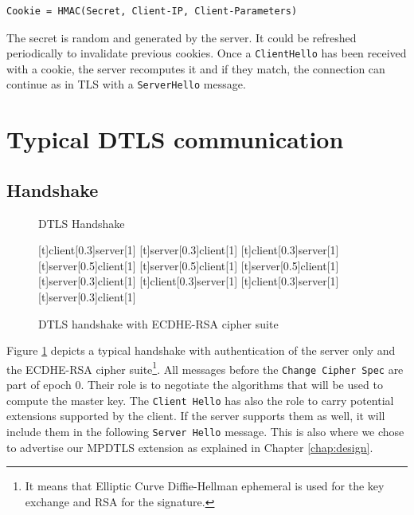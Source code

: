 \begin{lstlisting}
Cookie = HMAC(Secret, Client-IP, Client-Parameters)
\end{lstlisting}

The secret is random and generated by the server. It could be refreshed periodically to invalidate previous cookies. Once a \texttt{ClientHello} has been received with a cookie, the server recomputes it and if they match, the connection can continue as in TLS with a \texttt{ServerHello} message.

\section{Typical DTLS communication}

\subsection{Handshake}

\begin{figure}[!h]
\centering
\begin{msc}[r]{DTLS Handshake}

\setlength{\instfootheight}{0em}
\setlength{\instheadheight}{0em}
\setlength{\instdist}{0.7\linewidth}
\setlength{\levelheight}{3em}


[t]{client}[0.3]{server}[1]
\nextlevel
{}[t]{server}[0.3]{client}[1]
\nextlevel
{}[t]{client}[0.3]{server}[1]
\nextlevel
{}[t]{server}[0.5]{client}[1]
\nextlevel
{}[t]{server}[0.5]{client}[1]
\nextlevel
{}[t]{server}[0.5]{client}[1]
\nextlevel
{}[t]{server}[0.3]{client}[1]
\nextlevel
{}[t]{client}[0.3]{server}[1]
\nextlevel
{}[t]{client}[0.3]{server}[1]
\nextlevel
{}[t]{server}[0.3]{client}[1]
\nextlevel
\nextlevel
\end{msc}
\caption{DTLS handshake with ECDHE-RSA cipher suite}
\label{fig:dtls-handshake}
\end{figure}


Figure \ref{fig:dtls-handshake} depicts a typical handshake with authentication of the server only and the ECDHE-RSA cipher suite\footnote{It means that Elliptic Curve Diffie-Hellman ephemeral is used for the key exchange and RSA for the signature.}. All messages before the \texttt{Change Cipher Spec} are part of epoch 0. Their role is to negotiate the algorithms that will be used to compute the master key. The \texttt{Client Hello} has also the role to carry potential extensions supported by the client. If the server supports them as well, it will include them in the following \texttt{Server Hello} message. This is also where we chose to advertise our MPDTLS extension as explained in Chapter \ref{chap:design}.

